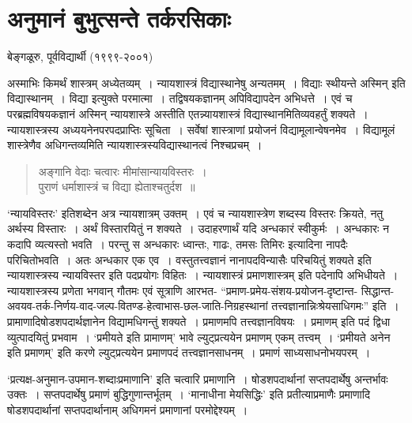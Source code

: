 {\fontsize{15}{17}\selectfont
\chapter{अनुमानं बुभुत्सन्ते  तर्करसिकाः}

\begin{center}
\smallskip

बेङ्गळूरु, पूर्वविद्यार्थी (१९९९-२००१)
\addrule
\end{center}

अस्माभिः किमर्थं शास्त्रम् अध्येतव्यम्~। न्यायशास्त्रं विद्यास्थानेषु अन्यतमम्~। विद्याः स्थीयन्ते अस्मिन् इति विद्यास्थानम्~। विद्या इत्युक्ते परमात्मा~। तद्विषयकज्ञानम् अपिविद्यापदेन अभिधत्ते~। एवं च परब्रह्मविषयकज्ञानं अस्मिन् न्यायशास्त्रे अस्तीति एतन्न्यायशास्त्रं विद्यास्थानमितिव्यवहर्तुं शक्यते~। न्यायशास्त्रस्य अध्ययनेनपरपदप्राप्तिः सूचिता~। सर्वेषां शास्त्राणां प्रयोजनं विद्यामूलान्वेषनमेव~। विद्यामूलं शास्त्रेणैव अधिगन्तव्यमिति न्यायशास्त्रस्यविद्यास्थानत्वं निश्चप्रचम्~। 
\begin{verse}
अङ्गानि वेदाः चत्वारः मीमांसान्यायविस्तरः~। \\
पुराणं धर्माशास्त्रं च विद्या ह्येताश्चतुर्दश~॥
\end{verse}
‘न्यायविस्तरः’ इतिशब्देन अत्र न्यायशात्रम् उक्तम्~। एवं च न्यायशास्त्रेण शब्दस्य विस्तरः क्रियते, नतु अर्थस्य विस्तारः~। अर्थं विस्तारयितुं न शक्यते~। उदाहरणार्थं यदि अन्धकारं स्वीकुर्मः~। अन्धकारः न कदापि व्यत्यस्तो भवति~। परन्तु स अन्धकारः ध्वान्तः, गाढः, तमसः तिमिरः इत्यादिना नापदैः परिचितोभवति~। अतः अन्धकार एक एव~। वस्तुतत्त्वज्ञानं नानापदविन्यासैः परिचयितुं शक्यते इति न्यायशास्त्रस्य न्यायविस्तर इति पदप्रयोगः विहितः~। न्यायशास्त्रं प्रमाणशास्त्रम् इति पदेनापि अभिधीयते~।  न्यायशास्त्रस्य प्रणेता भगवान् गौतमः एवं सूत्राणि आरभत- “प्रमाण-प्रमेय-संशय-प्रयोजन-दृष्टान्त- सिद्धान्त-अवयव-तर्क-निर्णय-वाद-जल्प-वितण्ड-हेत्वाभास-छल-जाति-निग्रहस्थानां तत्त्वज्ञानान्निःश्रेयसाधिगमः” इति~। प्रामाणादिषोडशपदार्थज्ञानेन विद्यामधिगन्तुं शक्यते~। प्रमाणमपि तत्त्वज्ञानविषयः~। प्रमाणम् इति पदं द्विधा व्युत्पादयितुं प्रभवाम~। ‘प्रमीयते इति प्रामाणम्’ भावे ल्युट्प्रत्ययेन प्रमाणम् एकम् तत्त्वम्~। ‘प्रमीयते अनेन इति प्रमाणम्’ इति करणे ल्युट्प्रत्ययेन प्रमाणपदं तत्त्वज्ञानसाधनम्~। प्रमाणं साध्यसाधनोभयपरम्~। 

‘प्रत्यक्ष-अनुमान-उपमान-शब्दाःप्रमाणानि’ इति चत्वारि प्रमाणानि~। षोडशपदार्थानां सप्तपदार्थेषु अन्तर्भावः उक्तः~। सप्तपदार्थेषु प्रमाणं बुद्धिगुणान्तर्भूतम्~। ‘मानाधीना मेयसिद्धिः’ इति प्रतीत्याप्रमाणैः प्रमाणादि षोडशपदार्थानां सप्तपदार्थानाम् अधिगमनं प्रमाणानां परमोद्देश्यम्~। 

}
